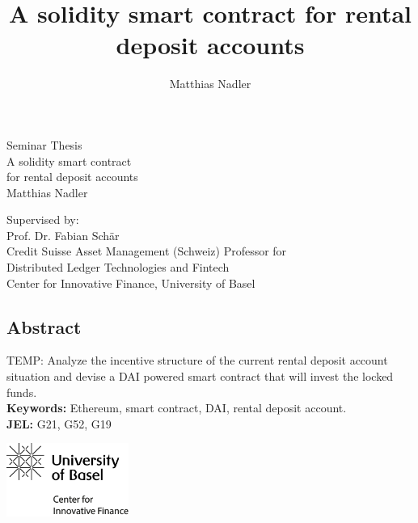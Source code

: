 \documentclass[12pt,a4paper,titlepage,oneside,english]{article}
\title{A solidity smart contract for rental deposit accounts}
\author{Matthias Nadler}
\begin{document}
\begin{center}
\vspace{1em}
\large{Seminar Thesis}\\
\huge A solidity smart contract \\
for rental deposit accounts \\
\Large \vspace{1em}
Matthias Nadler
\end{center}

\vspace{1em}
\normalsize
\begin{flushleft}
Supervised by:\\ 
Prof. Dr. Fabian Schär \\
Credit Suisse Asset Management (Schweiz) Professor for \\ 
Distributed Ledger Technologies and Fintech \\
Center for Innovative Finance, University of Basel
\end{flushleft}

\vspace{1em}
\onehalfspacing
\begin{center}
\section*{Abstract}
\end{center}
TEMP: Analyze the incentive structure of the current rental deposit account situation and devise
a DAI powered smart contract that will invest the locked funds. \\
\vfill
\textbf{Keywords:} Ethereum, smart contract, DAI, rental deposit account.\\
\noindent\textbf{JEL:} G21, G52, G19




\newpage
{}
\tableofcontents
\vfill
\begin{center}
\includegraphics[width=4cm]{../assetlib/images/logo_cif.png}
\end{center}
\singlespacing
\vspace{-1.5cm}
\end{document}
